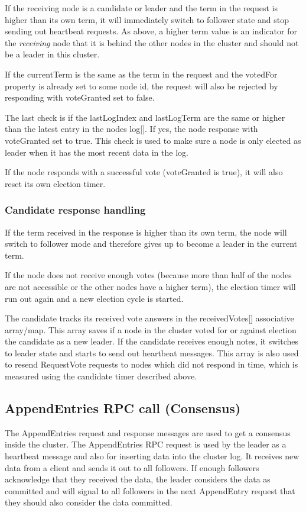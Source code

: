 If the receiving node is a candidate or leader and the term in the request is higher than its own term, it will immediately switch to follower state and stop sending out heartbeat requests.
As above, a higher term value is an indicator for the \textit{receiving} node that it is behind the other nodes in the cluster and should not be a leader in this cluster.

If the currentTerm is the same as the term in the request and the votedFor property is already set to some node id, the request will also be rejected by responding with voteGranted set to false.

The last check is if the lastLogIndex and lastLogTerm are the same or higher than the latest entry in the nodes log[]. If yes, the node response with voteGranted set to true. This check is used to make sure a node is only elected as leader when it has the most recent data in the log.

If the node responds with a successful vote (voteGranted is true), it will also reset its own election timer.

\subsubsection*{Candidate response handling}

If the term received in the response is higher than its own term, the node will switch to follower mode and therefore gives up to become a leader in the current term.

If the node does not receive enough votes (because more than half of the nodes are not accessible or the other nodes have a higher term), the election timer will run out again and a new election cycle is started.

The candidate tracks its received vote answers in the receivedVotes[] associative array/map. This array
saves if a node in the cluster voted for or against election the candidate as a new leader. If
the candidate receives enough notes, it switches to leader state and starts to send out heartbeat messages. This array is also used to resend RequestVote requests to nodes which did not respond in time,
which is measured using the candidate timer described above.

\subsection{AppendEntries RPC call (Consensus)}
The AppendEntries request and response messages are used to get a consensus inside the cluster.
The AppendEntries RPC request is used by the leader as a heartbeat message and also for
inserting data into the cluster log. It receives new data from a client and sends it out
to all followers. If enough followers acknowledge that they received the data, the leader
considers the data as committed and will signal to all followers in the next AppendEntry request 
that they should also consider the data committed.

